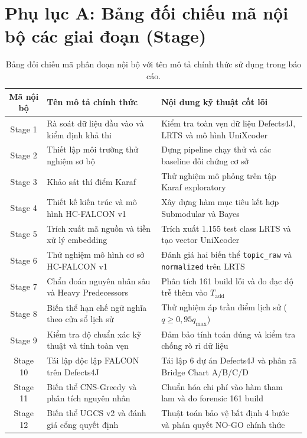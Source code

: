 \appendix
{}

\section*{Phụ lục A: Bảng đối chiếu mã nội bộ các giai đoạn (Stage)}
\label{app:stages}

\begin{table}[H]
\centering
\small
\renewcommand{\arraystretch}{1.2}
\setlength{\tabcolsep}{4pt}
\begin{tabular}{|c|p{4.2cm}|p{8.2cm}|}
\hline
\textbf{Mã nội bộ} & \textbf{Tên mô tả chính thức} & \textbf{Nội dung kỹ thuật cốt lõi} \\
\hline
Stage 1 & Rà soát dữ liệu đầu vào và kiểm định khả thi & Kiểm tra toàn vẹn dữ liệu Defects4J, LRTS và mô hình UniXcoder \\
\hline
Stage 2 & Thiết lập môi trường thử nghiệm sơ bộ & Dựng pipeline chạy thử và các baseline đối chứng cơ sở \\
\hline
Stage 3 & Khảo sát thí điểm Karaf & Thử nghiệm mô phỏng trên tập Karaf exploratory \\
\hline
Stage 4 & Thiết kế kiến trúc và mô hình HC-FALCON v1 & Xây dựng hàm mục tiêu kết hợp Submodular và Bayes \\
\hline
Stage 5 & Trích xuất mã nguồn và tiền xử lý embedding & Trích xuất 1.155 test class LRTS và tạo vector UniXcoder \\
\hline
Stage 6 & Thử nghiệm mô hình cơ sở HC-FALCON v1 & Đánh giá hai biến thể \texttt{topic\_raw} và \texttt{normalized} trên LRTS \\
\hline
Stage 7 & Chẩn đoán nguyên nhân sâu và Heavy Predecessors & Phân tích 161 build lỗi và đo đạc độ trễ thêm vào $T_{\text{add}}$ \\
\hline
Stage 8 & Biến thể hạn chế ngữ nghĩa theo cửa sổ lịch sử & Thử nghiệm áp trần điểm lịch sử ($q \ge 0{,}95 q_{\max}$) \\
\hline
Stage 9 & Kiểm tra độ chuẩn xác kỹ thuật và tính toàn vẹn & Đảm bảo tính toán đúng và kiểm tra chống rò rỉ dữ liệu \\
\hline
Stage 10 & Tái lập độc lập FALCON trên Defects4J & Tái lập 6 dự án Defects4J và phân rã Bridge Chart A/B/C/D \\
\hline
Stage 11 & Biến thể CNS-Greedy và phân tích nguyên nhân & Chuẩn hóa chi phí vào hàm tham lam và đo forensic 161 build \\
\hline
Stage 12 & Biến thể UGCS v2 và đánh giá cổng quyết định & Thuật toán bảo vệ bất định 4 bước và phán quyết NO-GO chính thức \\
\hline
\end{tabular}
\caption{Bảng đối chiếu mã phân đoạn nội bộ với tên mô tả chính thức sử dụng trong báo cáo.}
\end{table}


